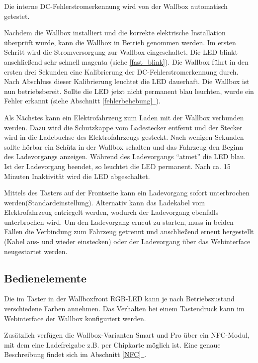 \documentclass[a4paper,10pt]{article}
\newcommand*{\fullref}[1]{Abschnitt \hyperref[{#1}]{\ref*{#1}~\nameref*{#1}}}
\begin{document}
\begin{multicols*}{2}
    Die interne DC-Fehlerstromerkennung wird von der Wallbox automatisch getestet.

    Nachdem die Wallbox installiert
    und die korrekte elektrische Installation überprüft wurde, kann die Wallbox in
    Betrieb genommen werden.
    Im ersten Schritt wird die Stromversorgung zur Wallbox eingeschaltet. Die
    LED blinkt anschließend sehr schnell magenta (siehe \ref{fast_blink}). Die Wallbox führt
    in den ersten drei Sekunden eine Kalibrierung der
    DC-Fehlerstromerkennung durch. Nach Abschluss dieser Kalibrierung
    leuchtet die LED dauerhaft. Die Wallbox ist nun betriebsbereit. Sollte die LED jetzt
    nicht permanent blau leuchten, wurde ein Fehler erkannt (siehe \fullref{fehlerbehebung}).

    Als Nächstes kann ein Elektrofahrzeug zum Laden mit der Wallbox verbunden
    werden. Dazu wird die Schutzkappe vom Ladestecker entfernt und der Stecker
	wird in die Ladebuchse des Elektrofahrzeugs gesteckt. Nach wenigen Sekunden sollte hörbar
    ein Schütz in der Wallbox schalten und das Fahrzeug den Beginn
    des Ladevorgangs anzeigen. Während des Ladevorgangs \enquote{atmet} die LED blau.
    Ist der Ladevorgang beendet, so leuchtet die LED permanent. Nach ca.
    15 Minuten Inaktivität wird die LED abgeschaltet.

	Mittels des Tasters auf der Frontseite kann ein Ladevorgang sofort unterbrochen werden(Standardeinstellung). Alternativ kann das Ladekabel vom Elektrofahrzeug entriegelt werden,
    wodurch der Ladevorgang ebenfalls unterbrochen wird. Um den Ladevorgang erneut
    zu starten, muss in beiden Fällen die Verbindung zum Fahrzeug getrennt und
    anschließend erneut hergestellt (Kabel aus- und wieder einstecken) oder der Ladevorgang über das Webinterface neugestartet werden.

    \vspace{-0.1cm}
    \subsection{Bedienelemente}\label{lockswitch}
	Die im Taster in der Wallboxfront RGB-LED kann je nach Betriebszustand
	verschiedene Farben annehmen.
	Das Verhalten bei einem Tastendruck kann im Webinterface der Wallbox konfiguriert werden.

    Zusätzlich verfügen die Wallbox-Varianten Smart und Pro über ein NFC-Modul,
	mit dem eine Ladefreigabe z.B. per Chipkarte möglich ist. Eine
    genaue Beschreibung findet sich im \fullref{NFC}.


\end{multicols*}
\end{document}
